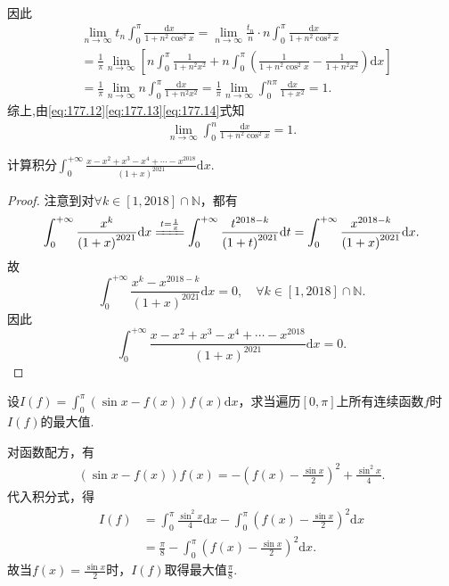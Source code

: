 \documentclass[../../main.tex]{subfiles}
\begin{document}
\begin{solution}
\begin{align*}
\end{align*}
因此
\begin{align}
&\lim\limits_{n\rightarrow \infty}t_n\int_0^{\pi}{\frac{\mathrm{d}x}{1+n^2\cos ^2x}}=\lim\limits_{n\rightarrow \infty}\frac{t_n}{n}\cdot n\int_0^{\pi}{\frac{\mathrm{d}x}{1+n^2\cos ^2x}} \nonumber \\
&=\frac{1}{\pi}\lim\limits_{n\rightarrow \infty}\left[ n\int_0^{\pi}{\frac{1}{1+n^2x^2}}+n\int_0^{\pi}{\left( \frac{1}{1+n^2\cos ^2x}-\frac{1}{1+n^2x^2} \right) \mathrm{d}x} \right] \nonumber \\
&=\frac{1}{\pi}\lim\limits_{n\rightarrow \infty}n\int_0^{\pi}{\frac{\mathrm{d}x}{1+n^2x^2}}=\frac{1}{\pi}\lim\limits_{n\rightarrow \infty}\int_0^{n\pi}{\frac{\mathrm{d}x}{1+x^2}}=1. \label{eq:177.14}
\end{align}
综上,由\eqref{eq:177.12}\eqref{eq:177.13}\eqref{eq:177.14}式知
\begin{align*}
\lim_{n\rightarrow \infty} \int_0^n{\frac{\mathrm{d}x}{1+n^2\cos ^2x}}=1.
\end{align*}

\end{solution}

\begin{example}
计算积分$\int_{0}^{+\infty} \frac{x - x^2 + x^3 - x^4 + \cdots - x^{2018}}{(1 + x)^{2021}} \mathrm{d}x$.
\end{example}
\begin{proof}
注意到对$\forall k\in \left[ 1,2018 \right] \cap \mathbb{N}$，都有
$$\int_0^{+\infty}{\frac{x^k}{\left( 1+x \right) ^{2021}}\mathrm{d}x}\xlongequal{t=\frac{1}{x}}\int_0^{+\infty}{\frac{t^{2018-k}}{\left( 1+t \right) ^{2021}}\mathrm{d}t}=\int_0^{+\infty}{\frac{x^{2018-k}}{\left( 1+x \right) ^{2021}}\mathrm{d}x}.$$
故
$$\int_0^{+\infty}{\frac{x^k-x^{2018-k}}{\left( 1+x \right) ^{2021}}\mathrm{d}x}=0,\quad \forall k\in \left[ 1,2018 \right] \cap \mathbb{N} .$$
因此
$$\int_0^{+\infty}{\frac{x-x^2+x^3-x^4+\cdots -x^{2018}}{\left( 1+x \right) ^{2021}}\mathrm{d}x}=0.$$

\end{proof}

\begin{example}
设$I(f) = \int_{0}^{\pi} (\sin x - f(x))f(x) \mathrm{d}x$，求当遍历$[0, \pi]$上所有连续函数$f$时$I(f)$的最大值.
\end{example}
\begin{solution}
对函数配方，有
\begin{align*}
(\sin x - f(x))f(x) = -\left(f(x) - \frac{\sin x}{2}\right)^2 + \frac{\sin^2 x}{4}.
\end{align*}
代入积分式，得
\begin{align*}
I(f) &= \int_{0}^{\pi} \frac{\sin^2 x}{4} \mathrm{d}x - \int_{0}^{\pi} \left(f(x) - \frac{\sin x}{2}\right)^2 \mathrm{d}x \\
&= \frac{\pi}{8} - \int_{0}^{\pi} \left(f(x) - \frac{\sin x}{2}\right)^2 \mathrm{d}x.
\end{align*}
故当\(f(x) = \frac{\sin x}{2}\)时，\(I(f)\)取得最大值\(\frac{\pi}{8}\).

\end{solution}
\end{document}
